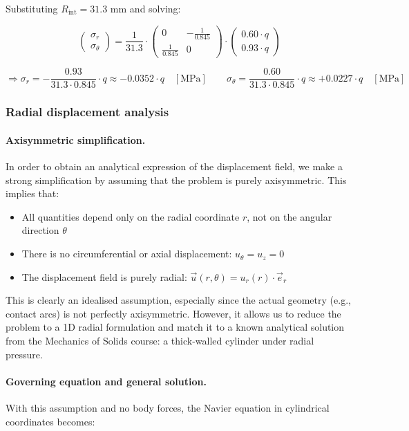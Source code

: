 \documentclass[12pt]{article}
\begin{document}
Substituting $R_{\text{int}} = 31.3$ mm and solving:

\[
\begin{pmatrix}
\sigma_r \\
\sigma_\theta
\end{pmatrix}
=
\frac{1}{31.3}
\cdot
\begin{pmatrix}
0 & -\frac{1}{0.845} \\
\frac{1}{0.845} & 0
\end{pmatrix}
\cdot
\begin{pmatrix}
0.60 \cdot q \\
0.93 \cdot q
\end{pmatrix}
\]

\[
\Rightarrow
\sigma_r = -\frac{0.93}{31.3 \cdot 0.845} \cdot q \approx \boxed{-0.0352 \cdot q} \quad [\text{MPa}]
\qquad
\sigma_\theta = \frac{0.60}{31.3 \cdot 0.845} \cdot q \approx \boxed{+0.0227 \cdot q} \quad [\text{MPa}]
\]

\subsubsection{Radial displacement analysis}

\paragraph{Axisymmetric simplification.} In order to obtain an analytical expression of the displacement field, we make a strong simplification by assuming that the problem is purely axisymmetric. This implies that:

\begin{itemize}
    \item All quantities depend only on the radial coordinate \( r \), not on the angular direction \( \theta \)
    \item There is no circumferential or axial displacement: \( u_\theta = u_z = 0 \)
    \item The displacement field is purely radial: \( \vec{u}(r, \theta) = u_r(r) \cdot \vec{e}_r \)
\end{itemize}

This is clearly an idealised assumption, especially since the actual geometry (e.g., contact arcs) is not perfectly axisymmetric. However, it allows us to reduce the problem to a 1D radial formulation and match it to a known analytical solution from the Mechanics of Solids course: a thick-walled cylinder under radial pressure.

\paragraph{Governing equation and general solution.} With this assumption and no body forces, the Navier equation in cylindrical coordinates becomes:
\end{document}
